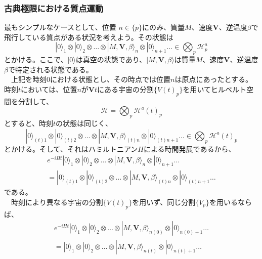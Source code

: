 \subsubsection{古典極限における質点運動}
最もシンプルなケースとして、位置 $n \in \{p\}$にのみ、質量$M$、速度$\mathbf{V}$、逆温度$\beta$で飛行している質点がある状況を考えよう。その状態は
\begin{equation}
    |0\rangle_1 \otimes |0\rangle_2 \otimes \ldots \otimes |M,\mathbf{V},\beta \rangle_n \otimes |0\rangle_{n+1} \ldots \in \bigotimes_p \mathcal{H}_p^a
\end{equation}
とかける。ここで、$|0\rangle$は真空の状態であり、$|M,\mathbf{V},\beta \rangle$は質量$M$、速度$\mathbf{V}$、逆温度$\beta$で特定される状態である。\\
　上記を時刻$0$における状態とし、その時点では位置$n$は原点にあったとする。時刻$t$においては、位置$n$が$\mathbf{V}t$にある宇宙の分割$\{V(t)_p\}$を用いてヒルベルト空間を分割して、
\begin{equation}
    \mathcal{H} = \bigotimes_p \mathcal{H}^a(t)_p
\end{equation}
とすると、時刻$t$の状態は同じく、
\begin{equation}
    |0\rangle_{(t)1} \otimes |0\rangle_{(t)2} \otimes \ldots \otimes |M,\mathbf{V},\beta \rangle_{(t)n} \otimes |0\rangle_{(t)n+1} \ldots \in \bigotimes_p \mathcal{H}^a(t)_p
\end{equation}
とかける。そして、それはハミルトニアン$H$による時間発展であるから、
\begin{equation}
\begin{aligned}
    e^{-iHt}|0\rangle_1 \otimes |0\rangle_2 \otimes \ldots \otimes |M,\mathbf{V},\beta \rangle_n \otimes |0\rangle_{n+1} \ldots \\
    =  |0\rangle_{(t)1} \otimes |0\rangle_{(t)2} \otimes \ldots \otimes |M,\mathbf{V},\beta \rangle_{(t)n} \otimes |0\rangle_{(t)n+1} \ldots
\end{aligned}
\end{equation}
である。\\
　時刻により異なる宇宙の分割$\{V(t)_p\}$を用いず、同じ分割$\{V_p\}$を用いるならば、
\begin{equation}
\begin{aligned}
    e^{-iHt}|0\rangle_1 \otimes |0\rangle_2 \otimes \ldots \otimes |M,\mathbf{V},\beta \rangle_{n(0)} \otimes |0\rangle_{n(0)+1} \ldots \\
    =  |0\rangle_{1} \otimes |0\rangle_{2} \otimes \ldots \otimes |M,\mathbf{V},\beta \rangle_{n(t)} \otimes |0\rangle_{n(t)+1} \ldots
\end{aligned}
\end{equation}
